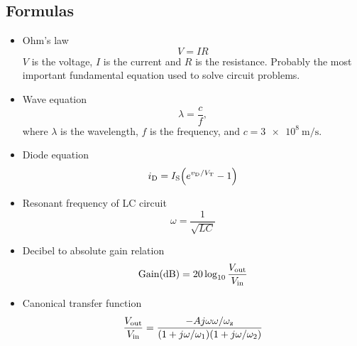 \subsection*{Formulas}
\begin{itemize}
  \item Ohm's law
  \begin{equation}
    V = IR
    \label{eq:vir}
  \end{equation}
  $V$ is the voltage, $I$ is the current and $R$ is the resistance. Probably
  the most important fundamental equation used to solve circuit problems.

  \item Wave equation
  \begin{equation}
    \lambda = \frac{c}{f},
    \label{eq:wave_eq}
  \end{equation}
  where $\lambda$ is the wavelength, $f$ is the frequency,
  and $c = \SI{3e8}{\m/\s}$.

  \item Diode equation
  \begin{equation*}
    \iD = \IS \pa{e^{\vD/\VT} - 1}
    \label{eq:diode_eq}
  \end{equation*}

  \item Resonant frequency of LC circuit
  \begin{equation}
    \omega = \frac{1}{\sqrt{LC}}
    \label{eq:lc}
  \end{equation}

  \item Decibel to absolute gain relation
  \begin{equation}
    \text{Gain}\pa{\text{dB}} = 20\log_{10}\frac{\Vout}{\Vin}
    \label{eq:gaindb}
  \end{equation}

  \item Canonical transfer function
  \begin{equation}
    \frac{V_\text{out}}{V_\text{in}} = \frac{
      -A j\omega \omega / \omega_\text{z}
    }{
      (1 + j\omega/\omega_1)(1 + j\omega/\omega_2)
    }
    \label{eq:tfcanon}
  \end{equation}
\end{itemize}